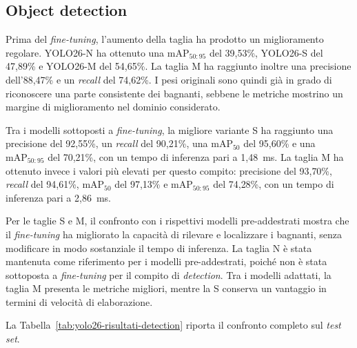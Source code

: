 \subsection{Object detection}

Prima del \textit{fine-tuning}, l'aumento della taglia ha prodotto un miglioramento regolare. YOLO26-N ha ottenuto una $\mathrm{mAP}_{50:95}$ del 39{,}53\%, YOLO26-S del 47{,}89\% e YOLO26-M del 54{,}65\%. La taglia M ha raggiunto inoltre una precisione dell'88{,}47\% e un \textit{recall} del 74{,}62\%. I pesi originali sono quindi già in grado di riconoscere una parte consistente dei bagnanti, sebbene le metriche mostrino un margine di miglioramento nel dominio considerato.

Tra i modelli sottoposti a \textit{fine-tuning}, la migliore variante S ha raggiunto una precisione del 92{,}55\%, un \textit{recall} del 90{,}21\%, una $\mathrm{mAP}_{50}$ del 95{,}60\% e una $\mathrm{mAP}_{50:95}$ del 70{,}21\%, con un tempo di inferenza pari a 1{,}48~ms. La taglia M ha ottenuto invece i valori più elevati per questo compito: precisione del 93{,}70\%, \textit{recall} del 94{,}61\%, $\mathrm{mAP}_{50}$ del 97{,}13\% e $\mathrm{mAP}_{50:95}$ del 74{,}28\%, con un tempo di inferenza pari a 2{,}86~ms.

Per le taglie S e M, il confronto con i rispettivi modelli pre-addestrati mostra che il \textit{fine-tuning} ha migliorato la capacità di rilevare e localizzare i bagnanti, senza modificare in modo sostanziale il tempo di inferenza. La taglia N è stata mantenuta come riferimento per i modelli pre-addestrati, poiché non è stata sottoposta a \textit{fine-tuning} per il compito di \textit{detection}. Tra i modelli adattati, la taglia M presenta le metriche migliori, mentre la S conserva un vantaggio in termini di velocità di elaborazione.

La Tabella~\ref{tab:yolo26-risultati-detection} riporta il confronto completo sul \textit{test set}.

